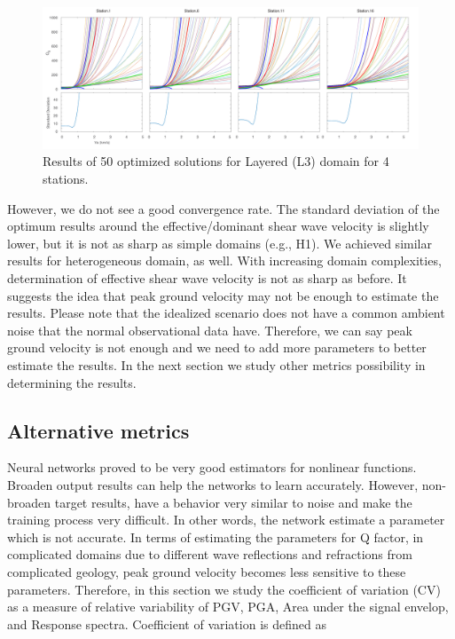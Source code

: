   \begin{figure}[ht]
    \centering
    \includegraphics[width=\textwidth]{figures/pdf/station_1_2000_1000_500_L3_nt.pdf}
    \caption{Results of 50 optimized solutions for Layered (L3) domain for 4 stations.}
    \label{fig:station_1_2000_1000_500_L3_nt}
\end{figure}

However, we do not see a good convergence rate. The standard deviation of the optimum results around the effective/dominant shear wave velocity is slightly lower, but it is not as sharp as simple domains (e.g., H1). We achieved similar results for heterogeneous domain, as well. With increasing domain complexities, determination of effective shear wave velocity is not as sharp as before. It suggests the idea that peak ground velocity may not be enough to estimate the results. Please note that the idealized scenario does not have a common ambient noise that the normal observational data have. Therefore, we can say peak ground velocity is not enough and we need to add more parameters to better estimate the results. In the next section we study other metrics possibility in determining the results. 

\subsection{Alternative metrics}

Neural networks proved to be very good estimators for nonlinear functions. Broaden output results can help the networks to learn accurately. However, non-broaden target results, have a behavior very similar to noise and make the training process very difficult. In other words, the network estimate a parameter which is not accurate. In terms of estimating the parameters for Q factor, in complicated domains due to different wave reflections and refractions from complicated geology, peak ground velocity becomes less sensitive to these parameters. Therefore, in this section we study the coefficient of variation (CV) as a measure of relative variability of PGV,  PGA, Area under the signal envelop, and Response spectra. Coefficient of variation is defined as 

